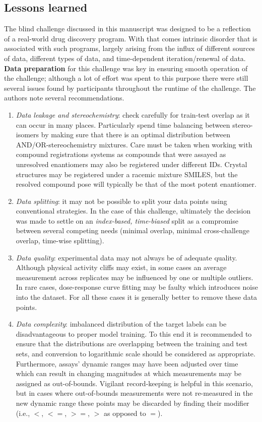 \documentclass[journal=jcim,manuscript=article]{achemso}
\begin{document}
\subsection{Lessons learned}
The blind challenge discussed in this manuscript was designed to be a reflection of a real-world drug discovery program. With that comes intrinsic disorder that is associated with such programs, largely arising from the influx of different sources of data, different types of data, and time-dependent iteration/renewal of data. \textbf{Data preparation} for this challenge was key in ensuring smooth operation of the challenge; although a lot of effort was spent to this purpose there were still several issues found by participants throughout the runtime of the challenge. The authors note several recommendations.
\begin{enumerate}
    \item \textit{Data leakage and stereochemistry}: check carefully for train-test overlap as it can occur in many places. Particularly spend time balancing between stereo-isomers by making sure that there is an optimal distribution between AND/OR-stereochemistry mixtures. Care must be taken when working with compound registrations systems as compounds that were assayed as unresolved enantiomers may also be registered under different IDs. Crystal structures may be registered under a racemic mixture SMILES, but the resolved compound pose will typically be that of the most potent enantiomer.
    \item \textit{Data splitting}: it may not be possible to split your data points using conventional strategies. In the case of this challenge, ultimately the decision was made to settle on an \textit{index-based, time-biased} split as a compromise between several competing needs (minimal overlap, minimal cross-challenge overlap, time-wise splitting). 
    \item \textit{Data quality}: experimental data may not always be of adequate quality. Although physical activity cliffs may exist, in some cases an average measurement across replicates may be influenced by one or multiple outliers. In rare cases, dose-response curve fitting may be faulty which introduces noise into the dataset. For all these cases it is generally better to remove these data points. 
    \item \textit{Data complexity}: imbalanced distribution of the target labels can be disadvantageous to proper model training. To this end it is recommended to ensure that the distributions are overlapping between the training and test sets, and conversion to logarithmic scale should be considered as appropriate. Furthermore, assays' dynamic ranges may have been adjusted over time which can result in changing magnitudes at which measurements may be assigned as out-of-bounds. Vigilant record-keeping is helpful in this scenario, but in cases where out-of-bounds measurements were not re-measured in the new dynamic range these points may be discarded by finding their modifier (i.e., $<$, $<=$, $>=$, $>$ as opposed to $=$).
\end{enumerate}
\end{document}
